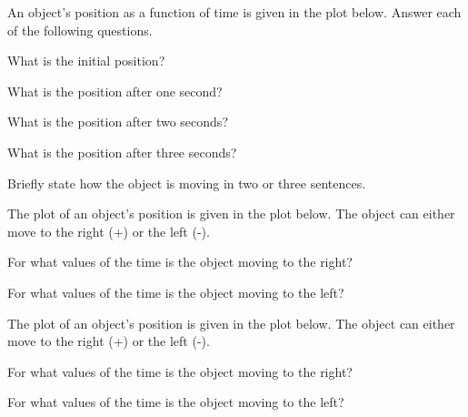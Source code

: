 


\begin{problem}
\item An object's position as a function of time is given in the plot
  below. Answer each of the following questions.

  \scalebox{0.5}{}

  \begin{subproblem}
  \item What is the initial position?
    \vfill

  \item What is the position after one second?
    \vfill
      
  \item What is the position after two seconds?
    \vfill

  \item What is the position after three seconds?
    \vfill

  \item Briefly state how the object is moving in two or three
    sentences. 
    \vfill

  \end{subproblem}

  \clearpage

\item The plot of an object's position is given in the plot below. The
  object can either move to the right (+) or the left (-).

  \scalebox{0.4}{}

  \begin{subproblem}
    \item For what values of the time is the object moving to the
      right?
      \vfill
    \item For what values of the time is the object moving to the
      left?
      \vfill
  \end{subproblem}

\item The plot of an object's position is given in the plot below. The
  object can either move to the right (+) or the left (-).

  \scalebox{0.4}{}

  \begin{subproblem}
    \item For what values of the time is the object moving to the
      right?
      \vfill
    \item For what values of the time is the object moving to the
      left?
      \vfill
  \end{subproblem}

\end{problem}

